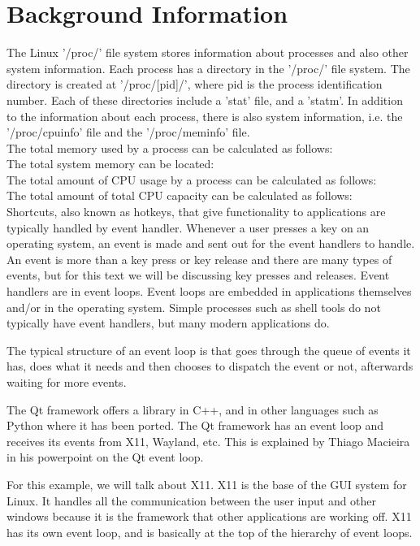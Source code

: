 \documentclass[12pt]{article}
\begin{document}
	\section{Background Information}
	The Linux '/proc/' file system stores information about processes and also other system information. Each process has a directory in the '/proc/' file system\cite[p. 792]{text}. The directory is created at '/proc/[pid]/', where pid is the process identification number. Each of these directories include a 'stat' file, and a 'statm'. In addition to the information about each process, there is also system information, i.e. the '/proc/cpuinfo' file and the '/proc/meminfo' file.\\
	The total memory used by a process can be calculated as follows:\\
	The total system memory can be located:\\
	The total amount of CPU usage by a process can be calculated as follows:\\
	The total amount of total CPU capacity can be calculated as follows:\\
	
Shortcuts, also known as hotkeys, that give functionality to applications are typically handled by event handler. Whenever a user presses a key on an operating system, an event is made and sent out for the event handlers to handle. An event is more than a key press or key release and there are many types of events, but for this text we will be discussing key presses and releases. Event handlers are in event loops. Event loops are embedded in applications themselves and/or in the operating system. Simple processes such as shell tools do not typically have event handlers, but many modern applications do.

The typical structure of an event loop is that goes through the queue of events it has, does what it needs and then chooses to dispatch the event or not, afterwards waiting for more events. 

The Qt framework offers a library in C++, and in other languages such as Python where it has been ported.
The Qt framework has an event loop and receives its events from X11, Wayland, etc.
This is explained by Thiago Macieira in his powerpoint on the Qt event loop\cite{QtSlides}.

For this example, we will talk about X11.
X11 is the base of the GUI system for Linux.
It handles all the communication between the user input and other windows because it is the framework that other applications are working off.
X11 has its own event loop, and is basically at the top of the hierarchy of event loops.
\end{document}
